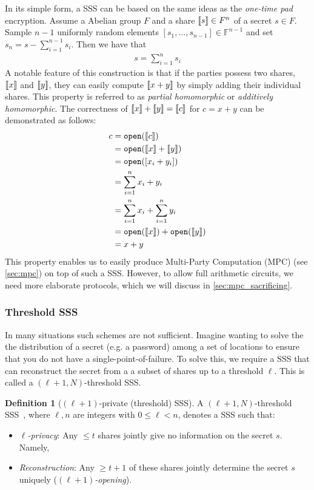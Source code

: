 \documentclass[11pt]{report}
\theoremstyle{definition}
\newtheorem{definition}{Definition}[section]
\theoremstyle{plain}
\begin{document}
In its simple form, a SSS can be based on the same ideas as the \textit{one-time pad} encryption. Assume a Abelian group $F$ and a share $\llbracket s \rrbracket \in F^n$ of a secret $s \in F$. Sample $n-1$ uniformly random elements $[s_1, \dots, s_{n-1}] \in \mathbb{F}^{n-1}$ and set $s_n = s - \sum_{i=1}^{n-1} s_i$. Then we have that
\begin{align*}
  s = \sum_{i=1}^{n} s_i
\end{align*}
A notable feature of this construction is that if the parties possess two shares, $\llbracket x \rrbracket$ and $\llbracket y \rrbracket$, they can easily compute $\llbracket x + y \rrbracket$ by simply adding their individual shares. This property is referred to as \textit{partial homomorphic} or \textit{additively homomorphic}. The correctness of $\llbracket x \rrbracket + \llbracket y \rrbracket = \llbracket c \rrbracket$ for $c = x + y$ can be demonstrated as follows:
\begin{align*}
  c & = \texttt{open}(\llbracket c \rrbracket)                         \\
    & = \texttt{open}(\llbracket x \rrbracket + \llbracket y \rrbracket)                \\
    & = \texttt{open}([x_i + y_i])                    \\
    & = \sum_{i=1}^{n} x_i + y_i                      \\
    & = \sum_{i=1}^{n} x_i + \sum_{i=1}^{n} y_i       \\
    & = \texttt{open}(\llbracket x \rrbracket) + \texttt{open}(\llbracket y \rrbracket) \\
    & = x + y
\end{align*}
This property enables us to easily produce Multi-Party Computation (MPC) (see \autoref{sec:mpc}) on top of such a SSS\@. However, to allow full arithmetic circuits, we need more elaborate protocols, which we will discuss in \autoref{sec:mpc_sacrificing}.

\subsubsection{Threshold SSS}\label{sub:threshold-sss}

In many situations such schemes are not sufficient. Imagine wanting to solve the the distribution of a secret (e.g. a password) among a set of locations to ensure that you do not have a single-point-of-failure. To solve this, we require a SSS that can reconstruct the secret from a a subset of shares up to a threshold $\ell$. This is called a $(\ell + 1, N)$-threshold SSS\@.

\begin{definition}[$(\ell + 1)$-private (threshold) SSS]\label{def:mpc-ss-threshold}
  A $(\ell + 1, N)$-threshold SSS~\cite{cramer2015secure}, where $\ell, n$ are integers with $0 \leq \ell < n$, denotes a SSS such that:
  \begin{itemize}[parsep=0pt, itemsep=0pt]
    \item \textit{$\ell$-privacy}: Any $\leq t$ shares jointly give no information on the secret $s$. Namely,
    \item \textit{Reconstruction}: Any $\geq t + 1$ of these shares jointly determine the secret $s$ uniquely (\textit{$(\ell + 1)$-opening}).
  \end{itemize}
\end{definition}
\end{document}
